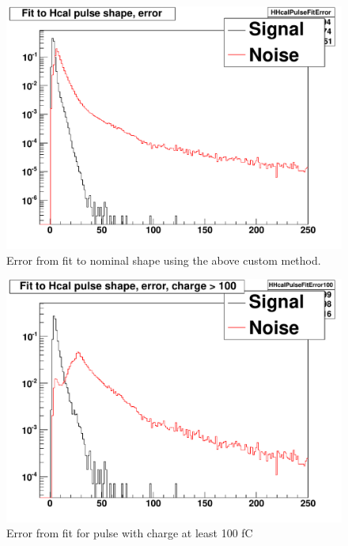 \begin{figure}
\includegraphics[width=120mm]{DailyLog/6275/6275HHcalPulseFitError.pdf}
\caption{Error from fit to nominal shape using the above custom method.}
\label{Figure_6275HHcalPulseFitError}
\end{figure}

\begin{figure}
\includegraphics[width=120mm]{DailyLog/6275/6275HHcalPulseFitError100.pdf}
\caption{Error from fit for pulse with charge at least 100 fC}
\label{Figure_6275HHcalPulseFitError100}
\end{figure}

